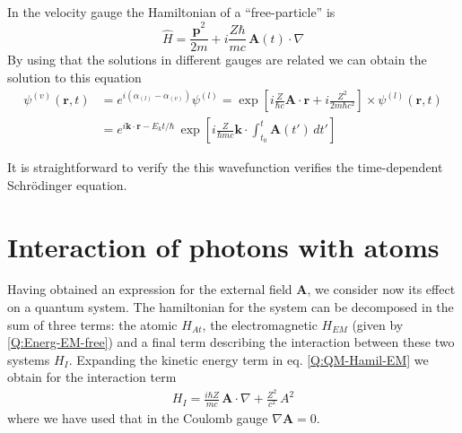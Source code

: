 In the velocity gauge the Hamiltonian of a ``free-particle'' is
\begin{equation*}
  \hat{H} = \frac{\hat{\bm{p}}^{2}}{2m} + i \frac{Z \hbar}{m c}\, \bm{A}(t) \cdot \nabla
\end{equation*}
By using that the solutions in different gauges are related we can obtain the solution to this equation
\begin{align}
  \psi^{(v)}(\bm{r},t) &= e^{i (\alpha_{(l)} - \alpha_{(v)})} \psi^{(l)} = \exp{\left[i \frac{Z}{\hbar c} \bm{A} \cdot \bm{r} + i \frac{Z^{2}}{2 m \hbar c^{2}}  \right]} \times \psi^{(l)}(\bm{r},t) \\
&= e^{i \bm{k}\cdot \bm{r} - E_{k}t/\hbar} \, \exp{\left[ i \frac{Z}{\hbar m c} \bm{k} \cdot \int_{t_{0}}^{t} \bm{A}(t') \, dt' \right]}
\end{align}

It is straightforward to verify the this wavefunction verifies the time-dependent Schr\"{o}dinger equation.

\section{Interaction of photons with atoms}

Having obtained an expression for the external field $\bm{A}$, we consider now its effect on a quantum system. The hamiltonian for the system can be decomposed in the sum of three terms: the atomic $H_{At}$, the electromagnetic $H_{EM}$ (given by \ref{Q:Energ-EM-free}) and a final term describing the interaction between these two systems $H_{I}$. Expanding the kinetic energy term in eq. \ref{Q:QM-Hamil-EM} we obtain for the interaction term
%
\begin{eqnarray}\label{Q:H_int-EM}
H_{I} = \frac{i \hbar Z}{m c}\, \bm{A} \cdot \nabla +
\frac{Z^{2}}{c^{2}} \, A^{2}
\end{eqnarray}
%
where we have used that in the Coulomb gauge $\nabla \bm{A}=0$.

